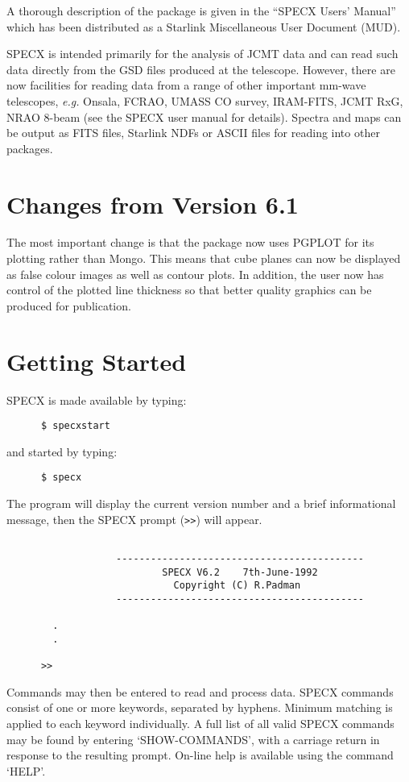 A thorough description of the package is given in the ``SPECX Users' Manual''
which has been distributed as a Starlink Miscellaneous User Document (MUD).

SPECX is intended primarily for the analysis of JCMT data and can read
such data directly from the GSD files produced at the
telescope. However, there are now facilities for reading data from a
range of other important mm-wave telescopes, {\em e.g.} Onsala,
FCRAO, UMASS CO survey, IRAM-FITS, JCMT RxG, NRAO 8-beam (see 
the SPECX user manual for details). 
Spectra and maps can be output as FITS files, Starlink NDFs or ASCII files
for reading into other packages.


\section {Changes from Version 6.1}

The most important change is that the package now uses PGPLOT for its
plotting rather than Mongo. This means that cube planes can now be displayed
as false colour images as well as contour plots. In addition, the user now 
has control of the plotted line thickness so that better quality graphics
can be produced for publication.

\section {Getting Started}

SPECX is made available by typing:
\begin{verbatim}
      $ specxstart
\end{verbatim}
and started by typing:
\begin{verbatim}
      $ specx 
\end{verbatim}
The program will display the current version number and
a brief informational message, then the SPECX prompt ({\tt>>}) will appear.

\begin{verbatim}

                   -------------------------------------------
                           SPECX V6.2    7th-June-1992
                             Copyright (C) R.Padman
                   -------------------------------------------

        .
        .

      >> 
\end{verbatim}

Commands may then be entered to read and process data.
SPECX commands consist of one or more keywords, separated
by hyphens. Minimum matching is applied to each keyword
individually. A full list of all valid SPECX commands
may be found by entering `SHOW-COMMANDS', with a carriage return
in response to the resulting prompt. On-line help is available
using the command `HELP'.

